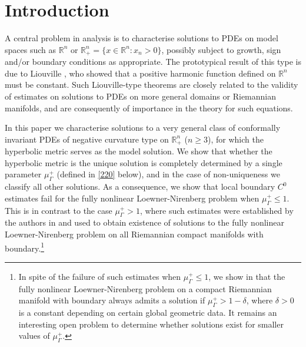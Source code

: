 \documentclass[12pt]{article}
\numberwithin{equation}{section}
\theoremstyle{plain}
\theoremstyle{definition}
\begin{document}
	
	\setcounter{tocdepth}{2}
	\tableofcontents
	


\section{Introduction}

A central problem in analysis is to characterise solutions to PDEs on model spaces such as $\mathbb{R}^n$ or $\mathbb{R}_+^n = \{x\in\mathbb{R}^n: x_n >0\}$, possibly subject to growth, sign and/or boundary conditions as appropriate. The prototypical result of this type is due to Liouville \cite{Liou1853}, who showed that a positive harmonic function defined on $\mathbb{R}^n$ must be constant. Such Liouville-type theorems are closely related to the validity of estimates on solutions to PDEs on more general domains or Riemannian manifolds, and are consequently of importance in the theory for such equations. \medskip

 In this paper we characterise solutions to a very general class of conformally invariant PDEs of negative curvature type on $\mathbb{R}^n_+$ ($n\geq 3$), for which the hyperbolic metric serves as the model solution. We show that whether the hyperbolic metric is the unique solution is completely determined by a single parameter $\mu_\Gamma^+$ (defined in \eqref{220} below), and in the case of non-uniqueness we classify all other solutions. As a consequence, we show that local boundary $C^0$ estimates fail for the fully nonlinear Loewner-Nirenberg problem when $\mu_\Gamma^+ \leq 1$. This is in contrast to the case $\mu_\Gamma^+>1$, where such estimates were established by the authors in \cite{DN23} and used to obtain existence of solutions to the fully nonlinear Loewner-Nirenberg problem on all Riemannian compact manifolds with boundary.\footnote{In spite of the failure of such estimates when $\mu_\Gamma^+ \leq 1$, we show in \cite{DN25b} that the fully nonlinear Loewner-Nirenberg problem on a compact Riemannian manifold with boundary always admits a solution if $\mu_\Gamma^+>1-\delta$, where $\delta>0$ is a constant depending on certain global geometric data. It remains an interesting open problem to determine whether solutions exist for smaller values of $\mu_\Gamma^+$.}\medskip
 
\end{document}
